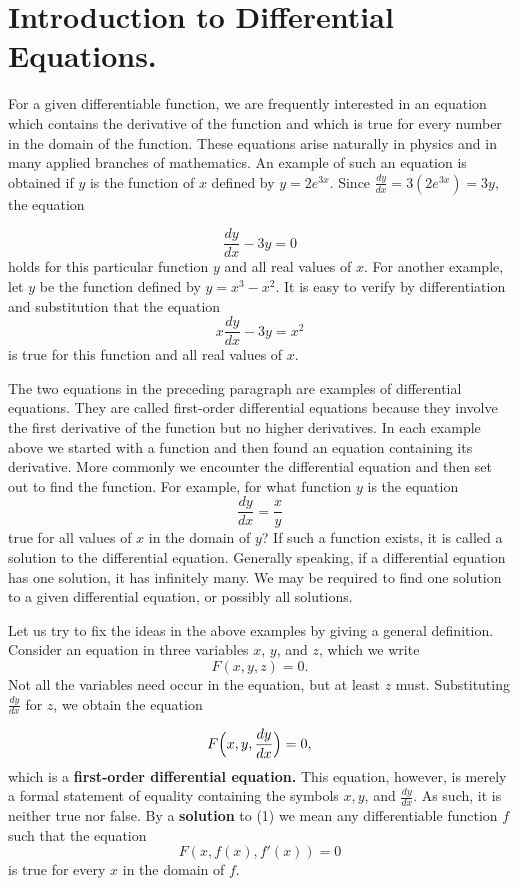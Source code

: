 \section{Introduction to Differential Equations.} \label{sec 5.5} 
For a given differentiable function, we are frequently interested in an equation which contains the derivative of the function and which is true for every number in the domain of the function. These equations arise naturally in physics and in many applied branches of mathematics. An example of such an equation is obtained if $y$ is the function of $x$ defined by $y = 2e^{3x}$. Since $\frac{dy}{dx} = 3(2e^{3x}) = 3y$, the equation

$$
\frac{dy}{dx} - 3y = 0
$$
\noindent holds for this particular function $y$ and all real values of $x$. For another example, let $y$ be the function defined by $y = x^{3} - x^{2}$. It is easy to verify by differentiation and substitution that the equation
$$
x \frac{dy}{dx} - 3y = x^2
$$
\noindent is true for this function and all real values of $x$.

The two equations in the preceding paragraph are examples of differential equations. They are called first-order differential equations because they involve the first derivative of the function but no higher derivatives. In each example above we started with a function and then found an equation containing its derivative. More commonly we encounter the differential equation and then set out to find the function. For example, for what function $y$ is the equation
$$
\frac{dy}{dx} = \frac{x}{y}
$$
\noindent true for all values of $x$ in the domain of $y$? If such a function exists, it is called a solution to the differential equation. Generally speaking, if a differential equation has one solution, it has infinitely many. We may be required to find one solution to a given differential equation, or possibly all solutions.

Let us try to fix the ideas in the above examples by giving a general definition. Consider an equation in three variables $x$, $y$, and $z$, which we write
$$
F(x, y, z) = 0. 
$$
\noindent Not all the variables need occur in the equation, but at least $z$ must. Substituting $\frac{dy}{dx}$ for $z$, we obtain the equation

\begin{equation}
F \Bigl( x, y, \frac{dy}{dx} \Bigr) = 0,
\label{eq5.5.1}
\end{equation}
which is a \textbf{first-order differential equation.} This equation, however, is merely a formal statement of equality containing the symbols $x, y$, and $\frac{dy}{dx}$. As such, it is neither true nor false. By a \textbf{solution} to (1) we mean any differentiable
function $f$ such that the equation
$$
F(x, f(x), f'(x)) = 0
$$
\noindent is true for every $x$ in the domain of $f$.

